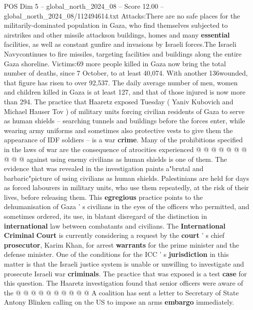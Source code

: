\begin{textsample}{POS Dim 5 – global\_north\_2024\_08 – Score 12.00 – global\_north\_2024\_08/112494614.txt}  \label{ex:f5_pos_375}
Attacks:There are no safe places for the militarily-dominated population in Gaza, who find themselves subjected to airstrikes and other missile attackson buildings, homes and many \textbf{essential} facilities, as well as constant gunfire and invasions by Israeli forces.The Israeli Navycontinues to fire missiles, targeting facilities and buildings along the entire Gaza shoreline.
Victims:69 more people killed in Gaza now bring the total number of deaths, since 7 October, to at least 40,074.
With another 136wounded, that figure has risen to over 92,537.
The daily average number of men, women and children killed in Gaza is at least 127, and that of those injured is now more than 294.
The practice that Haaretz exposed Tuesday ( Yaniv Kubovich and Michael Hauser Tov ) of military units forcing civilian residents of Gaza to serve as human shields -- searching tunnels and buildings before the forces enter, while wearing army uniforms and sometimes also protective vests to give them the appearance of IDF soldiers -- is a war \textbf{crime}.
Many of the prohibitions specified in the laws of war are the consequence of atrocities experienced @ @ @ @ @ @ @ @ @ @ against using enemy civilians as human shields is one of them.
The evidence that was revealed in the investigation paints a"brutal and barbaric"picture of using civilians as human shields.
Palestinians are held for days as forced labourers in military units, who use them repeatedly, at the risk of their lives, before releasing them.
This \textbf{egregious} practice points to the dehumanisation of Gaza ' s civilians in the eyes of the officers who permitted, and sometimes ordered, its use, in blatant disregard of the distinction in \textbf{international} law between combatants and civilians.
The \textbf{International} \textbf{Criminal} \textbf{Court} is currently considering a request by the \textbf{court} ' s chief \textbf{prosecutor}, Karim Khan, for arrest \textbf{warrants} for the prime minister and the defense minister.
One of the conditions for the ICC ' s \textbf{jurisdiction} in this matter is that the Israeli justice system is unable or unwilling to investigate and prosecute Israeli war \textbf{criminals}.
The practice that was exposed is a test \textbf{case} for this question.
The Haaretz investigation found that senior officers were aware of the @ @ @ @ @ @ @ @ @ @ A coalition has sent a letter to Secretary of State Antony Blinken calling on the US to impose an arms \textbf{embargo} immediately.

\end{textsample}
